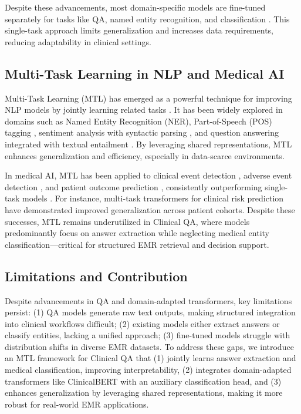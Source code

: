 Despite these advancements, most domain-specific models are fine-tuned separately for tasks like QA, named entity recognition, and classification \cite{agarwal2024domain}. This single-task approach limits generalization and increases data requirements, reducing adaptability in clinical settings.



\subsection{Multi-Task Learning in NLP and Medical AI}
Multi-Task Learning (MTL) has emerged as a powerful technique for improving NLP models by jointly learning related tasks \cite{ruder2017overview}. It has been widely explored in domains such as Named Entity Recognition (NER), Part-of-Speech (POS) tagging \cite{liu2019multi}, sentiment analysis with syntactic parsing \cite{sogaard2016deep}, and question answering integrated with textual entailment \cite{clark2019boolq}. By leveraging shared representations, MTL enhances generalization and efficiency, especially in data-scarce environments.

In medical AI, MTL has been applied to clinical event detection \cite{li2020multi}, adverse event detection \cite{wei2022multi}, and patient outcome prediction \cite{yoon2022clinical}, consistently outperforming single-task models \cite{liu2022mtlhealth}. For instance, multi-task transformers for clinical risk prediction \cite{mohamed2023riskprediction} have demonstrated improved generalization across patient cohorts. Despite these successes, MTL remains underutilized in Clinical QA, where models predominantly focus on answer extraction while neglecting medical entity classification—critical for structured EMR retrieval and decision support.


\subsection{Limitations and Contribution}
Despite advancements in QA and domain-adapted transformers, key limitations persist: (1) QA models generate raw text outputs, making structured integration into clinical workflows difficult; (2) existing models either extract answers or classify entities, lacking a unified approach; (3) fine-tuned models struggle with distribution shifts in diverse EMR datasets. To address these gaps, we introduce an MTL framework for Clinical QA that (1) jointly learns answer extraction and medical classification, improving interpretability, (2) integrates domain-adapted transformers like ClinicalBERT with an auxiliary classification head, and (3) enhances generalization by leveraging shared representations, making it more robust for real-world EMR applications.

